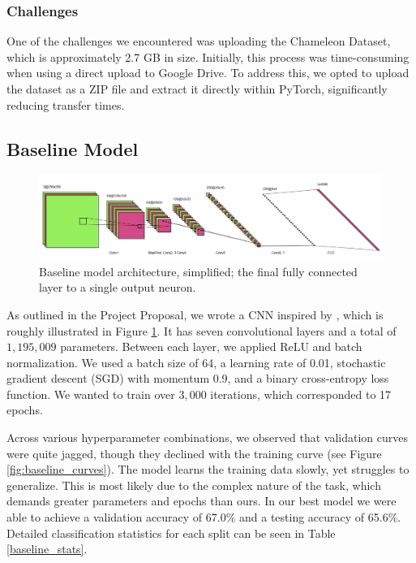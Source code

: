 \documentclass{article} %
\begin{document}
\subsubsection{Challenges}
One of the challenges we encountered was uploading the Chameleon Dataset, which is approximately 2.7 GB in size. Initially, this process was time-consuming when using a direct upload to Google Drive. To address this, we opted to upload the dataset as a ZIP file and extract it directly within PyTorch, significantly reducing transfer times.

\subsection{Baseline Model}

\begin{figure}[h]
    \begin{center}
        \includegraphics[scale=0.45]{figs/baseline.png}
    \end{center}
    \caption{Baseline model architecture, simplified; the final fully connected layer to a single output neuron.}
    \label{fig:baseline_arch}
\end{figure}

As outlined in the Project Proposal, we wrote a CNN inspired by \citet{wang2020cnngeneratedimagessurprisinglyeasy}, which is roughly illustrated in Figure \ref{fig:baseline_arch}. It has seven convolutional layers and a total of $1,195,009$ parameters. Between each layer, we applied ReLU and batch normalization. We used a batch size of 64, a learning rate of 0.01, stochastic gradient descent (SGD) with momentum 0.9, and a binary cross-entropy loss function. We wanted to train over $3,000$ iterations, which corresponded to 17 epochs.

Across various hyperparameter combinations, we observed that validation curves were quite jagged, though they declined with the training curve (see Figure \ref{fig:baseline_curves}). The model learns the training data slowly, yet struggles to generalize. This is most likely due to the complex nature of the task, which demands greater parameters and epochs than ours. In our best model we were able to achieve a validation accuracy of 67.0\% and a testing accuracy of 65.6\%. Detailed classification statistics for each split can be seen in Table \ref{baseline_stats}.
\end{document}
